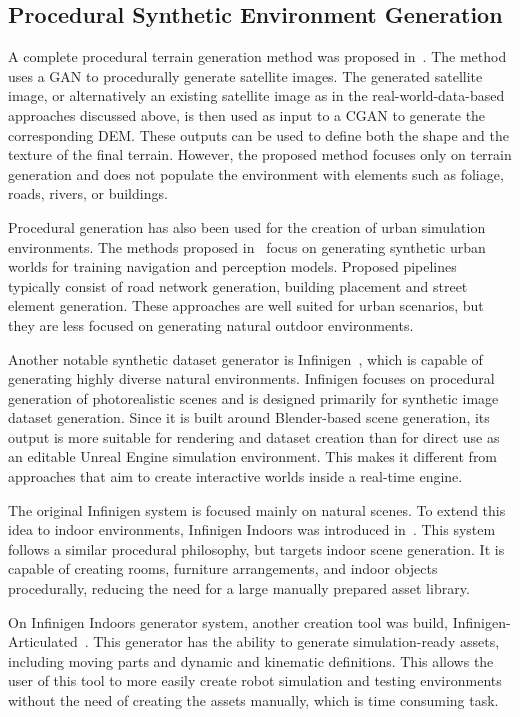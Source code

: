\subsection{Procedural Synthetic Environment Generation}

A complete procedural terrain generation method was proposed in~\cite{bk_procedural_terrain_gan}. The method uses a \ac{GAN} to procedurally generate satellite images. The generated satellite image, or alternatively an existing satellite image as in the real-world-data-based approaches discussed above, is then used as input to a \ac{CGAN} to generate the corresponding \ac{DEM}. These outputs can be used to define both the shape and the texture of the final terrain. However, the proposed method focuses only on terrain generation and does not populate the environment with elements such as foliage, roads, rivers, or buildings.

Procedural generation has also been used for the creation of urban simulation environments. The methods proposed in~\cite{bk_simworld_robotics_urban,bk_procedural_urban} focus on generating synthetic urban worlds for training navigation and perception models. Proposed pipelines typically consist of road network generation, building placement and street element generation. These approaches are well suited for urban scenarios, but they are less focused on generating natural outdoor environments.

Another notable synthetic dataset generator is Infinigen~\cite{bk_infinigen_outdoor}, which is capable of generating highly diverse natural environments. Infinigen focuses on procedural generation of photorealistic scenes and is designed primarily for synthetic image dataset generation. Since it is built around Blender-based scene generation, its output is more suitable for rendering and dataset creation than for direct use as an editable Unreal Engine simulation environment. This makes it different from approaches that aim to create interactive worlds inside a real-time engine.

The original Infinigen system is focused mainly on natural scenes. To extend this idea to indoor environments, Infinigen Indoors was introduced in~\cite{bk_infinigen_indoor}. This system follows a similar procedural philosophy, but targets indoor scene generation. It is capable of creating rooms, furniture arrangements, and indoor objects procedurally, reducing the need for a large manually prepared asset library.

On Infinigen Indoors generator system, another creation tool was build, Infinigen-Articulated~\cite{bk_infinigen_articulated}. This generator has the ability to generate simulation-ready assets, including moving parts and dynamic and kinematic definitions. This allows the user of this tool to more easily create robot simulation and testing environments without the need of creating the assets manually, which is time consuming task.

